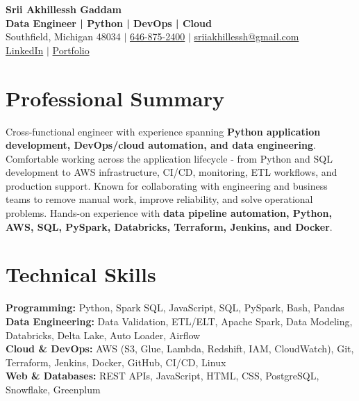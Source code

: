 \documentclass[letterpaper,10pt]{article}
\begin{document}
\fontsize{9.35pt}{10.45pt}\selectfont

\begin{center}
    {\LARGE \textbf{Srii Akhillessh Gaddam}} \\[-1pt]
    \textbf{Data Engineer | Python | DevOps | Cloud} \\[2pt]
    Southfield, Michigan 48034 $|$
    \href{tel:6468752400}{646-875-2400} $|$
    \href{mailto:sriiakhillessh@gmail.com}{sriiakhillessh@gmail.com} \\[1pt]
    \href{https://www.linkedin.com/in/srii-akhiilessh-gaddam-b48668191/}{LinkedIn} $|$
    \href{https://sriiakhillesshg.github.io/portfolio/}{Portfolio}
\end{center}
\vspace{-8pt}

\section{Professional Summary}
\small{Cross-functional engineer with experience spanning \textbf{Python application development, DevOps/cloud automation, and data engineering}. Comfortable working across the application lifecycle - from Python and SQL development to AWS infrastructure, CI/CD, monitoring, ETL workflows, and production support. Known for collaborating with engineering and business teams to remove manual work, improve reliability, and solve operational problems. Hands-on experience with \textbf{data pipeline automation, Python, AWS, SQL, PySpark, Databricks, Terraform, Jenkins, and Docker}.}

\section{Technical Skills}
\small{
\textbf{Programming:} Python, Spark SQL, JavaScript, SQL, PySpark, Bash, Pandas \\
\textbf{Data Engineering:} Data Validation, ETL/ELT, Apache Spark, Data Modeling, Databricks, Delta Lake, Auto Loader, Airflow \\
\textbf{Cloud \& DevOps:} AWS (S3, Glue, Lambda, Redshift, IAM, CloudWatch), Git, Terraform, Jenkins, Docker, GitHub, CI/CD, Linux \\
\textbf{Web \& Databases:} REST APIs, JavaScript, HTML, CSS, PostgreSQL, Snowflake, Greenplum
}

\end{document}
